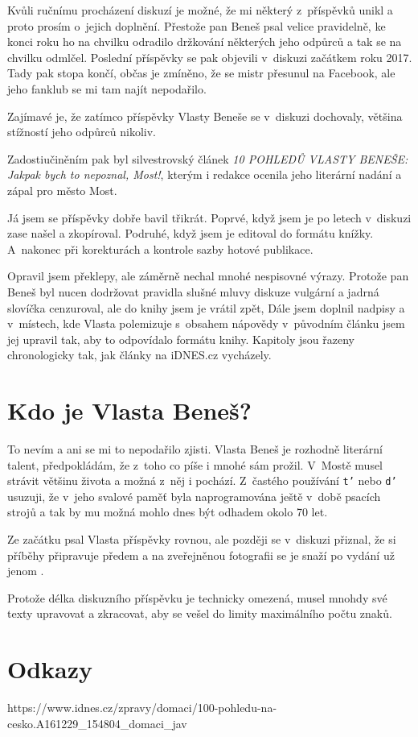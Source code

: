 Kvůli ručnímu procházení diskuzí je možné, že mi některý z~příspěvků unikl a
proto prosím o~jejich doplnění. Přestože pan Beneš psal velice pravidelně, ke
konci roku ho na chvilku odradilo držkování některých jeho odpůrců a tak se na
chvilku odmlčel. Poslední příspěvky se pak objevili v~diskuzi začátkem roku
2017. Tady pak stopa končí, občas je zmíněno, že se mistr přesunul na Facebook,
ale jeho fanklub se mi tam najít nepodařilo.

Zajímavé je, že zatímco příspěvky Vlasty Beneše se v~diskuzi dochovaly, většina
stížností jeho odpůrců nikoliv.

Zadostiučiněním pak byl silvestrovský článek {\em 10 POHLEDŮ VLASTY BENEŠE:
Jakpak bych to nepoznal, Most!}, kterým i redakce ocenila jeho literární nadání
a zápal pro město Most.

Já jsem se příspěvky dobře bavil třikrát. Poprvé, když jsem je po letech
v~diskuzi zase našel a zkopíroval. Podruhé, když jsem je editoval do formátu
knížky. A~nakonec při korekturách a kontrole sazby hotové publikace.

Opravil jsem překlepy, ale záměrně nechal mnohé nespisovné výrazy. Protože pan
Beneš byl nucen dodržovat pravidla slušné mluvy diskuze vulgární a jadrná
slovíčka cenzuroval, ale do knihy jsem je vrátil zpět,  Dále jsem doplnil
nadpisy a v~místech, kde Vlasta polemizuje s~obsahem nápovědy v~původním článku
jsem jej upravil tak, aby to odpovídalo formátu knihy. Kapitoly jsou řazeny
chronologicky tak, jak články na iDNES.cz vycházely.

\section{Kdo je Vlasta Beneš?}

To nevím a ani se mi to nepodařilo zjisti. Vlasta Beneš je rozhodně literární
talent, předpokládám, že z~toho co píše i mnohé sám prožil. V~Mostě musel
strávit většinu života a možná z~něj i pochází. Z~častého používání {\tt t'}
nebo {\tt d'} usuzuji, že v~jeho svalové paměť byla naprogramována ještě v~době
psacích strojů a tak by mu možná mohlo dnes být odhadem okolo 70 let.

Ze začátku psal Vlasta příspěvky rovnou, ale později se v~diskuzi přiznal, že
si příběhy připravuje předem a na zveřejněnou fotografii se je snaží po vydání
už jenom .

Protože délka diskuzního příspěvku je technicky omezená, musel mnohdy své texty
upravovat a zkracovat, aby se vešel do limity maximálního počtu znaků.

\section{Odkazy}

https://www.idnes.cz/zpravy/domaci/100-pohledu-na-cesko.A161229_154804_domaci_jav

